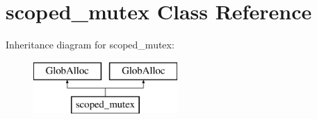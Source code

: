 \hypertarget{classscoped__mutex}{\section{scoped\-\_\-mutex Class Reference}
\label{classscoped__mutex}
}
Inheritance diagram for scoped\-\_\-mutex\-:\begin{figure}[H]
\begin{center}
\leavevmode
\includegraphics[height=2.000000cm]{classscoped__mutex}
\end{center}
\end{figure}

